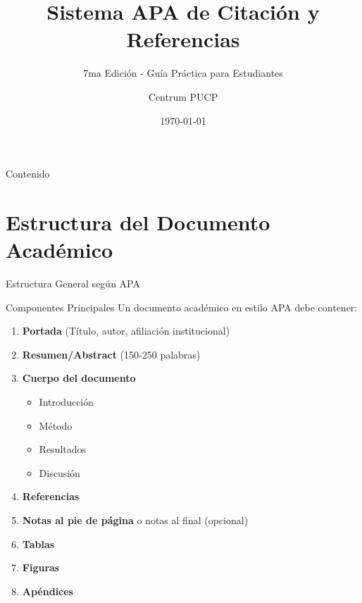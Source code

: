 \documentclass[spanish,aspectratio=169]{beamer}
\title[Estilo APA 7ma Ed.]{Sistema APA de Citación y Referencias}
\subtitle{7ma Edición - Guía Práctica para Estudiantes}
\author{Centrum PUCP}
\institute{Centro de Negocios - Pontificia Universidad Católica del Perú}
\date{\today}
\begin{document}
	
	\begin{frame}
		\titlepage
	\end{frame}
	
	\begin{frame}{Contenido}
		\tableofcontents
	\end{frame}
	
	\section{Estructura del Documento Académico}
	
	\begin{frame}{Estructura General según APA}
		\begin{block}{Componentes Principales}
			Un documento académico en estilo APA debe contener:
		\end{block}
		
		\begin{enumerate}
			\item \textbf{Portada} (Título, autor, afiliación institucional)
			\item \textbf{Resumen/Abstract} (150-250 palabras)
			\item \textbf{Cuerpo del documento}
			\begin{itemize}
				\item Introducción
				\item Método
				\item Resultados
				\item Discusión
			\end{itemize}
			\item \textbf{Referencias}
			\item \textbf{Notas al pie de página} o notas al final (opcional)
			\item \textbf{Tablas}
			\item \textbf{Figuras}
			\item \textbf{Apéndices}
		\end{enumerate}
	\end{frame}
	
\end{document}
